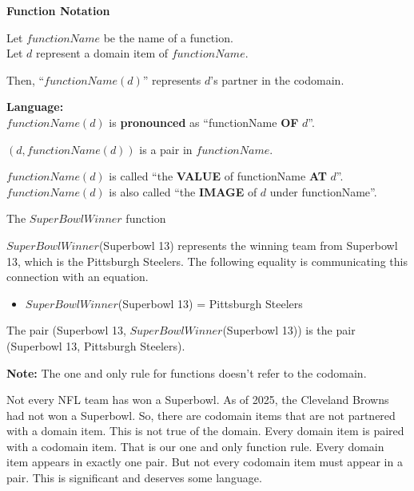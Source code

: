 \documentclass{ximera}
\begin{document}
\begin{notation} \textbf{\textcolor{red!50!green}{Function Notation}}  


Let $functionName$ be the name of a function. \\
Let $d$ represent a domain item of $functionName$.


Then, ``\textbf{\textcolor{blue!55!black}{$functionName(d)$}}'' represents $d$'s partner in the codomain. 


\textbf{\textcolor{red!70!black}{Language:}} \\
$functionName(d)$ is \textbf{\textcolor{blue!55!black}{pronounced}} as ``functionName \textbf{\textcolor{purple!85!blue}{OF}} $d$''.


$(d, functionName(d))$ is a pair in $functionName$. 


$functionName(d)$ is called ``the \textbf{\textcolor{purple!85!blue}{VALUE}} of functionName \textbf{\textcolor{purple!85!blue}{AT}} $d$''. \\
$functionName(d)$ is also called ``the \textbf{\textcolor{purple!85!blue}{IMAGE}} of $d$ under functionName''. 



\end{notation}







\begin{example} The $SuperBowlWinner$ function


$SuperBowlWinner$(Superbowl 13) represents the winning team from Superbowl 13, which is the Pittsburgh Steelers.  The following equality is communicating this connection with an equation.

\begin{itemize}
\item $SuperBowlWinner$(Superbowl 13) = Pittsburgh Steelers  
\end{itemize}



The pair (Superbowl 13, $SuperBowlWinner$(Superbowl 13)) is the pair (Superbowl 13, Pittsburgh Steelers). 

\end{example}

\textbf{Note:} The one and only rule for functions doesn't refer to the codomain.

Not every NFL team has won a Superbowl. As of 2025, the Cleveland Browns had not won a Superbowl.  So, there are codomain items that are not partnered with a domain item.  This is not true of the domain.  Every domain item is paired with a codomain item.  That is our one and only function rule.  Every domain item appears in exactly one pair.  But not every codomain item must appear in a pair.  This is significant and deserves some language.
\end{document}
